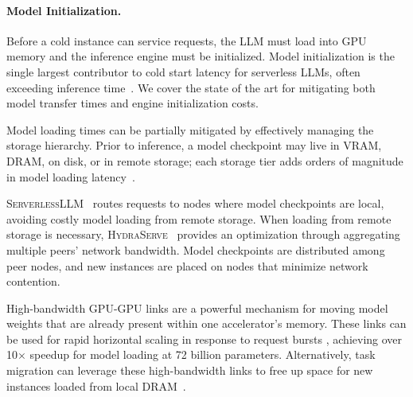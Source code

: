 \newcommand{\ServerlessLLM}{\textsc{ServerlessLLM}}
\newcommand{\HydraServe}{\textsc{HydraServe}}
\newcommand{\DEEPSERVE}{\textsc{DeepServe}}
\newcommand{\ServerlessLoRA}{\textsc{ServerlessLoRA}}
\newcommand{\PipeBoost}{\textsc{PipeBoost}}
\newcommand{\Medusa}{\textsc{Medusa}}
\newcommand{\InstaInfer}{\textsc{InstaInfer}}
\newcommand{\SLINFER}{\textsc{Slinfer}}
\newcommand{\WAGES}{\textsc{Wages}}
\newcommand{\Torpor}{\textsc{Torpor}}
\newcommand{\lambdascale}{\textsc{$\lambda$Scale}}

\paragraph{Model Initialization.}

Before a cold instance can service requests, the LLM must load into GPU memory and the inference engine must be initialized.
Model initialization is the single largest contributor to cold start latency for serverless LLMs, often exceeding inference time~\cite{serverlessllm, medusa, deepserve}.
We cover the state of the art for mitigating both model transfer times and engine initialization costs.

Model loading times can be partially mitigated by effectively managing the storage hierarchy.
Prior to inference, a model checkpoint may live in VRAM, DRAM, on disk, or in remote storage; each storage tier adds orders of magnitude in model loading latency~\cite{deepserve}.

\ServerlessLLM~\cite{serverlessllm} routes requests to nodes where model checkpoints are local, avoiding costly model loading from remote storage.
When loading from remote storage is necessary, \HydraServe~\cite{hydraserve} provides an optimization through aggregating multiple peers' network bandwidth.
Model checkpoints are distributed among peer nodes, and new instances are placed on nodes that minimize network contention.

High-bandwidth GPU-GPU links are a powerful mechanism for moving model weights that are already present within one accelerator's memory.
These links can be used for rapid horizontal scaling in response to request bursts \cite{yu2026lambdascaleenablingfastscaling, deepserve}, achieving over 10$\times$ speedup for model loading at 72 billion parameters.
Alternatively, task migration can leverage these high-bandwidth links to free up space for new instances loaded from local DRAM~\cite{serverlessllm}.

